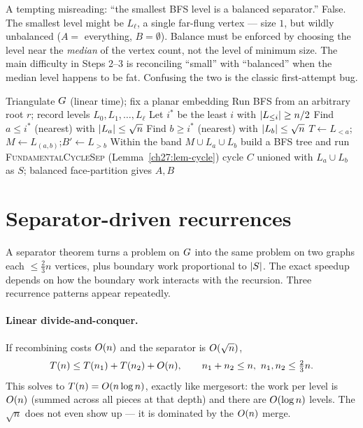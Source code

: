 \begin{trapbox}
A tempting misreading: ``the smallest BFS level is a balanced separator.'' False. The smallest level might be $L_\ell$, a single far-flung vertex --- size $1$, but wildly unbalanced ($A=$ everything, $B=\emptyset$). Balance must be enforced by choosing the level near the \emph{median} of the vertex count, not the level of minimum size. The main difficulty in Steps 2--3 is reconciling ``small'' with ``balanced'' when the median level happens to be fat. Confusing the two is the classic first-attempt bug.
\end{trapbox}

\begin{algorithm}[H]
\caption{\textsc{PlanarSeparator}$(\Gph)$ --- Lipton--Tarjan outline}
\label{ch27:alg-sep}
\DontPrintSemicolon
{}
Triangulate $G$ (linear time); fix a planar embedding\;
Run BFS from an arbitrary root $r$; record levels $L_0,L_1,\dots,L_\ell$\;
Let $i^*$ be the least $i$ with $\lvert L_{\le i}\rvert\ge n/2$ 
Find $a\le i^*$ (nearest) with $\lvert L_a\rvert\le\sqrt n$\;
Find $b\ge i^*$ (nearest) with $\lvert L_b\rvert\le\sqrt n$ 
$T\gets L_{<a}$;\quad $M\gets L_{(a,b)}$;\quad $B'\gets L_{>b}$\;
Within the band $M\cup L_a\cup L_b$ build a BFS tree and run \textsc{FundamentalCycleSep} (Lemma~\ref{ch27:lem-cycle})\;
\Return cycle $C$ unioned with $L_a\cup L_b$ as $S$; balanced face-partition gives $A,B$\;
\end{algorithm}

\section{Separator-driven recurrences}
\label{ch27:sec-recur}

A separator theorem turns a problem on $G$ into the same problem on two graphs each $\le\tfrac23 n$ vertices, plus boundary work proportional to $\lvert S\rvert$. The exact speedup depends on how the boundary work interacts with the recursion. Three recurrence patterns appear repeatedly.

\paragraph{Linear divide-and-conquer.} If recombining costs $O(n)$ and the separator is $O(\sqrt n)$,
\[
  T(n) \le T(n_1)+T(n_2)+O(n),\qquad n_1+n_2\le n,\ n_1,n_2\le\tfrac23 n.
\]
This solves to $T(n)=O(n\log n)$, exactly like mergesort: the work per level is $O(n)$ (summed across all pieces at that depth) and there are $O(\log n)$ levels. The $\sqrt n$ does not even show up --- it is dominated by the $O(n)$ merge.

